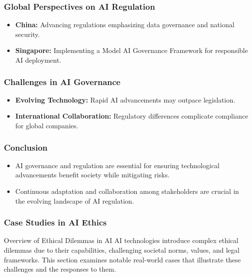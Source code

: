 \documentclass[aspectratio=169]{beamer}
\begin{document}
\begin{frame}[fragile]
    \frametitle{Global Perspectives on AI Regulation}
    \begin{itemize}
        \item \textbf{China:} Advancing regulations emphasizing data governance and national security.
        \item \textbf{Singapore:} Implementing a Model AI Governance Framework for responsible AI deployment.
    \end{itemize}
\end{frame}

\begin{frame}[fragile]
    \frametitle{Challenges in AI Governance}
    \begin{itemize}
        \item \textbf{Evolving Technology:} Rapid AI advancements may outpace legislation.
        \item \textbf{International Collaboration:} Regulatory differences complicate compliance for global companies.
    \end{itemize}
\end{frame}

\begin{frame}[fragile]
    \frametitle{Conclusion}
    \begin{itemize}
        \item AI governance and regulation are essential for ensuring technological advancements benefit society while mitigating risks.
        \item Continuous adaptation and collaboration among stakeholders are crucial in the evolving landscape of AI regulation.
    \end{itemize}
\end{frame}

\begin{frame}[fragile]
  \frametitle{Case Studies in AI Ethics}
  \begin{block}{Overview of Ethical Dilemmas in AI}
    AI technologies introduce complex ethical dilemmas due to their capabilities, challenging societal norms, values, and legal frameworks. This section examines notable real-world cases that illustrate these challenges and the responses to them.
  \end{block}
\end{frame}
\end{document}
